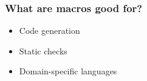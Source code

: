 \documentclass[svgnames,hyperref={bookmarks=false}]{beamer}
\begin{document}


\begin{frame}[fragile]
\frametitle{}

\vskip40pt
\begin{center}
\end{center}
\end{frame}

\begin{frame}[fragile]
\frametitle{What are macros good for?}

\begin{itemize}
\item Code generation
\item Static checks
\item Domain-specific languages
\end{itemize}
\end{frame}
\end{document}
